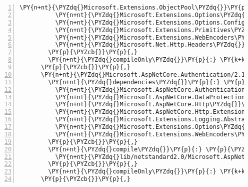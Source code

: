 \begin{Verbatim}[commandchars=\\\{\},numbers=left,firstnumber=1,stepnumber=1,numberblanklines=0]
          \PY{n+nt}{\PYZdq{}Microsoft.Extensions.ObjectPool\PYZdq{}}\PY{p}{:} \PY{l+s+s2}{\PYZdq{}2.1.0\PYZhy{}rc1\PYZhy{}final\PYZdq{}}\PY{p}{,}
          \PY{n+nt}{\PYZdq{}Microsoft.Extensions.Options\PYZdq{}}\PY{p}{:} \PY{l+s+s2}{\PYZdq{}2.1.0\PYZhy{}rc1\PYZhy{}final\PYZdq{}}\PY{p}{,}
          \PY{n+nt}{\PYZdq{}Microsoft.Extensions.Options.ConfigurationExtensions\PYZdq{}}\PY{p}{:} \PY{l+s+s2}{\PYZdq{}2.1.0\PYZhy{}rc1\PYZhy{}final\PYZdq{}}\PY{p}{,}
          \PY{n+nt}{\PYZdq{}Microsoft.Extensions.Primitives\PYZdq{}}\PY{p}{:} \PY{l+s+s2}{\PYZdq{}2.1.0\PYZhy{}rc1\PYZhy{}final\PYZdq{}}\PY{p}{,}
          \PY{n+nt}{\PYZdq{}Microsoft.Extensions.WebEncoders\PYZdq{}}\PY{p}{:} \PY{l+s+s2}{\PYZdq{}2.1.0\PYZhy{}rc1\PYZhy{}final\PYZdq{}}\PY{p}{,}
          \PY{n+nt}{\PYZdq{}Microsoft.Net.Http.Headers\PYZdq{}}\PY{p}{:} \PY{l+s+s2}{\PYZdq{}2.1.0\PYZhy{}rc1\PYZhy{}final\PYZdq{}}
        \PY{p}{\PYZcb{}}\PY{p}{,}
        \PY{n+nt}{\PYZdq{}compileOnly\PYZdq{}}\PY{p}{:} \PY{k+kc}{true}
      \PY{p}{\PYZcb{}}\PY{p}{,}
      \PY{n+nt}{\PYZdq{}Microsoft.AspNetCore.Authentication/2.1.0\PYZhy{}rc1\PYZhy{}final\PYZdq{}}\PY{p}{:} \PY{p}{\PYZob{}}
        \PY{n+nt}{\PYZdq{}dependencies\PYZdq{}}\PY{p}{:} \PY{p}{\PYZob{}}
          \PY{n+nt}{\PYZdq{}Microsoft.AspNetCore.Authentication.Core\PYZdq{}}\PY{p}{:} \PY{l+s+s2}{\PYZdq{}2.1.0\PYZhy{}rc1\PYZhy{}final\PYZdq{}}\PY{p}{,}
          \PY{n+nt}{\PYZdq{}Microsoft.AspNetCore.DataProtection\PYZdq{}}\PY{p}{:} \PY{l+s+s2}{\PYZdq{}2.1.0\PYZhy{}rc1\PYZhy{}final\PYZdq{}}\PY{p}{,}
          \PY{n+nt}{\PYZdq{}Microsoft.AspNetCore.Http\PYZdq{}}\PY{p}{:} \PY{l+s+s2}{\PYZdq{}2.1.0\PYZhy{}rc1\PYZhy{}final\PYZdq{}}\PY{p}{,}
          \PY{n+nt}{\PYZdq{}Microsoft.AspNetCore.Http.Extensions\PYZdq{}}\PY{p}{:} \PY{l+s+s2}{\PYZdq{}2.1.0\PYZhy{}rc1\PYZhy{}final\PYZdq{}}\PY{p}{,}
          \PY{n+nt}{\PYZdq{}Microsoft.Extensions.Logging.Abstractions\PYZdq{}}\PY{p}{:} \PY{l+s+s2}{\PYZdq{}2.1.0\PYZhy{}rc1\PYZhy{}final\PYZdq{}}\PY{p}{,}
          \PY{n+nt}{\PYZdq{}Microsoft.Extensions.Options\PYZdq{}}\PY{p}{:} \PY{l+s+s2}{\PYZdq{}2.1.0\PYZhy{}rc1\PYZhy{}final\PYZdq{}}\PY{p}{,}
          \PY{n+nt}{\PYZdq{}Microsoft.Extensions.WebEncoders\PYZdq{}}\PY{p}{:} \PY{l+s+s2}{\PYZdq{}2.1.0\PYZhy{}rc1\PYZhy{}final\PYZdq{}}
        \PY{p}{\PYZcb{}}\PY{p}{,}
        \PY{n+nt}{\PYZdq{}compile\PYZdq{}}\PY{p}{:} \PY{p}{\PYZob{}}
          \PY{n+nt}{\PYZdq{}lib/netstandard2.0/Microsoft.AspNetCore.Authentication.dll\PYZdq{}}\PY{p}{:} \PY{p}{\PYZob{}}\PY{p}{\PYZcb{}}
        \PY{p}{\PYZcb{}}\PY{p}{,}
        \PY{n+nt}{\PYZdq{}compileOnly\PYZdq{}}\PY{p}{:} \PY{k+kc}{true}
      \PY{p}{\PYZcb{}}\PY{p}{,}

\end{Verbatim}
